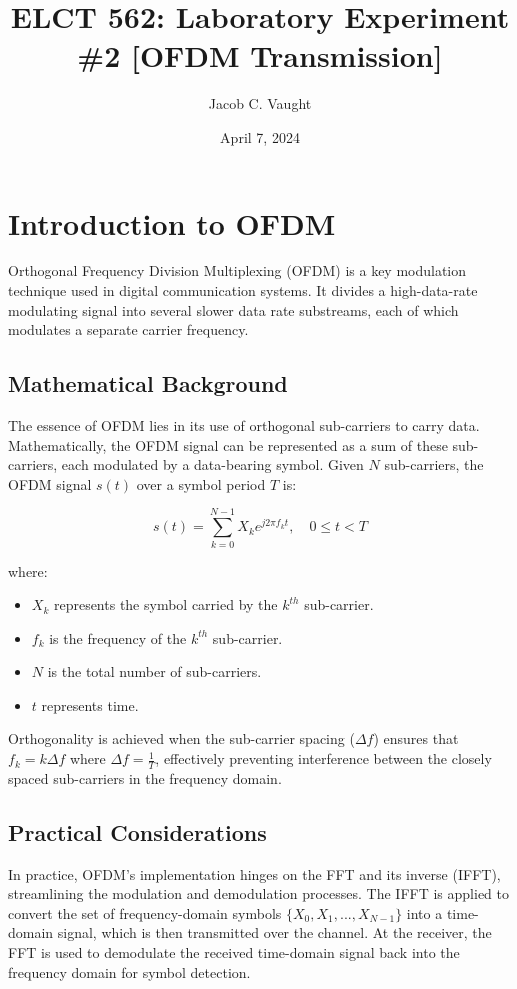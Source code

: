 \documentclass{article}
\title{ELCT 562: Laboratory Experiment \#2 [OFDM Transmission]}
\author{Jacob C. Vaught}
\date{April 7, 2024}
\begin{document}
\maketitle
\section*{Introduction to OFDM}
Orthogonal Frequency Division Multiplexing (OFDM) is a key modulation technique used in digital communication systems. It divides a high-data-rate modulating signal into several slower data rate substreams, each of which modulates a separate carrier frequency.

\subsection*{Mathematical Background}
The essence of OFDM lies in its use of orthogonal sub-carriers to carry data. Mathematically, the OFDM signal can be represented as a sum of these sub-carriers, each modulated by a data-bearing symbol. Given \(N\) sub-carriers, the OFDM signal \(s(t)\) over a symbol period \(T\) is:

\[
s(t) = \sum_{k=0}^{N-1} X_k e^{j2\pi f_k t}, \quad 0 \leq t < T
\]

where:
\begin{itemize}
    \item \(X_k\) represents the symbol carried by the \(k^{th}\) sub-carrier.
    \item \(f_k\) is the frequency of the \(k^{th}\) sub-carrier.
    \item \(N\) is the total number of sub-carriers.
    \item \(t\) represents time.
\end{itemize}

Orthogonality is achieved when the sub-carrier spacing (\(\Delta f\)) ensures that \(f_k = k\Delta f\) where \(\Delta f = \frac{1}{T}\), effectively preventing interference between the closely spaced sub-carriers in the frequency domain.

\subsection*{Practical Considerations}
In practice, OFDM's implementation hinges on the FFT and its inverse (IFFT), streamlining the modulation and demodulation processes. The IFFT is applied to convert the set of frequency-domain symbols \(\{X_0, X_1, ..., X_{N-1}\}\) into a time-domain signal, which is then transmitted over the channel. At the receiver, the FFT is used to demodulate the received time-domain signal back into the frequency domain for symbol detection.
\end{document}
